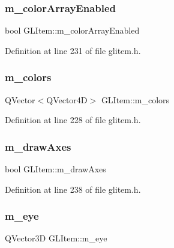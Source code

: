 \subsubsection{\texorpdfstring{m\_colorArrayEnabled}{m\_colorArrayEnabled}}
{\footnotesize\ttfamily bool G\+L\+Item\+::m\+\_\+color\+Array\+Enabled\hspace{0.3cm}{\ttfamily [protected]}}



Definition at line 231 of file glitem.\+h.

\mbox{\label{class_g_l_item_aeb7650aa679d0b95cc3bb99e9bf220fc}} 
\subsubsection{\texorpdfstring{m\_colors}{m\_colors}}
{\footnotesize\ttfamily Q\+Vector$<$Q\+Vector4D$>$ G\+L\+Item\+::m\+\_\+colors\hspace{0.3cm}{\ttfamily [protected]}}



Definition at line 228 of file glitem.\+h.

\mbox{\label{class_g_l_item_ac323dad2cc4683da8925b461856603d3}} 
\subsubsection{\texorpdfstring{m\_drawAxes}{m\_drawAxes}}
{\footnotesize\ttfamily bool G\+L\+Item\+::m\+\_\+draw\+Axes\hspace{0.3cm}{\ttfamily [protected]}}



Definition at line 238 of file glitem.\+h.

\mbox{\label{class_g_l_item_a586ce733c3f1509966d0d0aaf7edde0d}} 
\subsubsection{\texorpdfstring{m\_eye}{m\_eye}}
{\footnotesize\ttfamily Q\+Vector3D G\+L\+Item\+::m\+\_\+eye\hspace{0.3cm}{\ttfamily [protected]}}



